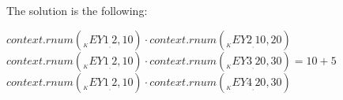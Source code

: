 The solution is the following:
\begin{Solution}
\solitem ${{context.rnum(__KEY1__, 2, 10)}} \cdot {{context.rnum(__KEY2__, 10, 20)}}$
\solitem ${{context.rnum(__KEY1__, 2, 10)}} \cdot {{context.rnum(__KEY3__, 20, 30)}} = {{10+5}}$ 
\solitem ${{context.rnum(__KEY1__, 2, 10)}} \cdot {{context.rnum(__KEY4__, 20, 30)}}$ 
\end{Solution}